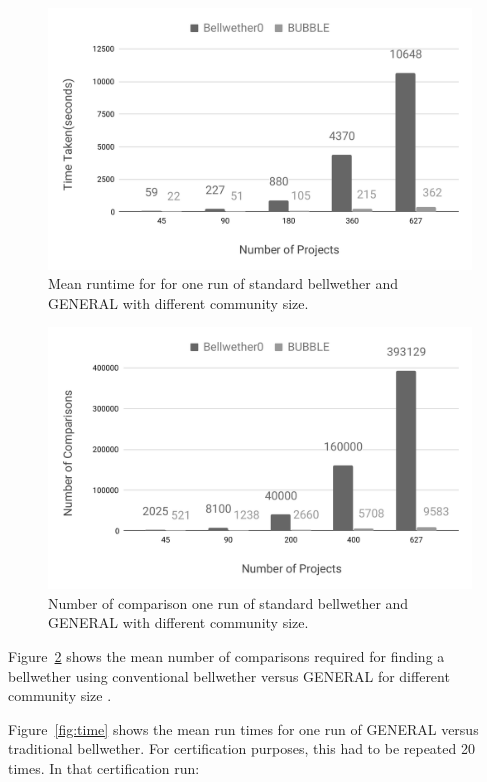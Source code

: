 \documentclass[10pt,journal,compsoc]{IEEEtran}
\newcommand{\fig}[1]{Figure~\ref{fig:#1}}
\begin{document}
\begin{figure}[!b]
    \centering
    \includegraphics[width=\linewidth]{figs/Time_Compare.pdf}
    \caption{Mean runtime for for one run of standard bellwether and GENERAL with different community size.}
    \label{fig:compare_time}
\end{figure}

\begin{figure}[!b]
    \centering
    \includegraphics[width=\linewidth]{figs/compare.pdf}
    \caption{Number of comparison one run of standard bellwether and GENERAL with different community size.}
    \label{fig:compare}
\end{figure}

\fig{compare} shows the mean number of comparisons required for finding a bellwether using conventional bellwether versus GENERAL for different community size . 


\fig{time} shows the mean run times for one run of GENERAL versus traditional bellwether. For certification purposes, this had to be repeated 20 times. In that certification run:
\end{document}
